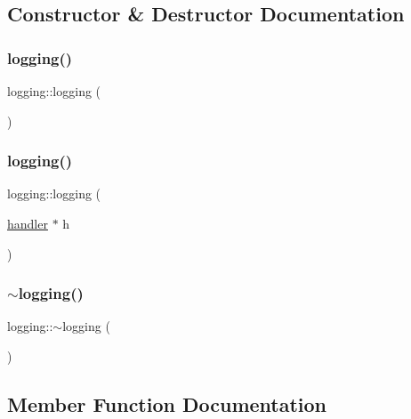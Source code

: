 \subsection{Constructor \& Destructor Documentation}
\mbox{\label{classlogging_a9fc3278b328fdec4922315d85f772489}} 
\subsubsection{\texorpdfstring{logging()}{logging()}\hspace{0.1cm}{\footnotesize\ttfamily [1/2]}}
{\footnotesize\ttfamily logging\+::logging (\begin{DoxyParamCaption}{ }\end{DoxyParamCaption})}

\mbox{\label{classlogging_a38300200148601f298e30b8a84ad686c}} 
\subsubsection{\texorpdfstring{logging()}{logging()}\hspace{0.1cm}{\footnotesize\ttfamily [2/2]}}
{\footnotesize\ttfamily logging\+::logging (\begin{DoxyParamCaption}\item[{\hyperlink{classhandler}{handler} $\ast$}]{h }\end{DoxyParamCaption})}

\mbox{\label{classlogging_aa50e430d72fd366e7f906b61242c658f}} 
\subsubsection{\texorpdfstring{$\sim$logging()}{~logging()}}
{\footnotesize\ttfamily logging\+::$\sim$logging (\begin{DoxyParamCaption}{ }\end{DoxyParamCaption})}



\subsection{Member Function Documentation}
\mbox{\label{classlogging_aa15fabd099ea702ad39a8bb82e56d56c}} 

